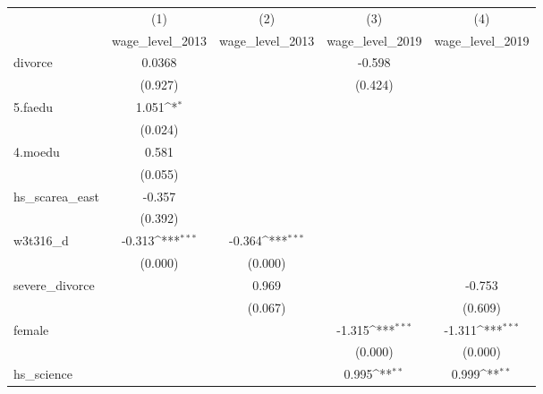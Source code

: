 {
\def\sym#1{\ifmmode^{#1}\else\(^{#1}\)\fi}
\begin{tabular}{l*{4}{c}}
\hline\hline
            &\multicolumn{1}{c}{(1)}&\multicolumn{1}{c}{(2)}&\multicolumn{1}{c}{(3)}&\multicolumn{1}{c}{(4)}\\
            &\multicolumn{1}{c}{wage\_level\_2013}&\multicolumn{1}{c}{wage\_level\_2013}&\multicolumn{1}{c}{wage\_level\_2019}&\multicolumn{1}{c}{wage\_level\_2019}\\
\hline
divorce     &      0.0368         &                     &      -0.598         &                     \\
            &     (0.927)         &                     &     (0.424)         &                     \\
[1em]
5.faedu     &       1.051\sym{*}  &                     &                     &                     \\
            &     (0.024)         &                     &                     &                     \\
[1em]
4.moedu     &       0.581         &                     &                     &                     \\
            &     (0.055)         &                     &                     &                     \\
[1em]
hs\_scarea\_east&      -0.357         &                     &                     &                     \\
            &     (0.392)         &                     &                     &                     \\
[1em]
w3t316\_d    &      -0.313\sym{***}&      -0.364\sym{***}&                     &                     \\
            &     (0.000)         &     (0.000)         &                     &                     \\
[1em]
severe\_divorce&                     &       0.969         &                     &      -0.753         \\
            &                     &     (0.067)         &                     &     (0.609)         \\
[1em]
female      &                     &                     &      -1.315\sym{***}&      -1.311\sym{***}\\
            &                     &                     &     (0.000)         &     (0.000)         \\
[1em]
hs\_science  &                     &                     &       0.995\sym{**} &       0.999\sym{**} \\

\end{tabular}}
